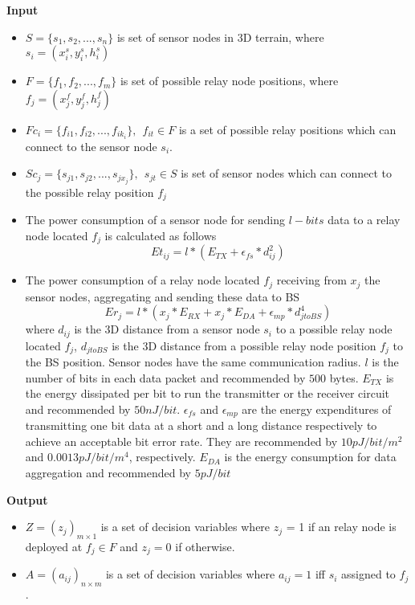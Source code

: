 \documentclass[paper.tex]{subfiles}
\begin{document}
	\textbf{Input}
	\begin{itemize}
		\item  $S = \{s_1, s_2,...,s_n\}$ is set of sensor nodes in 3D terrain, where $s_i = (x^s_i, y^s_i, h^s_i)$
		\item  $F = \{f_1,f_2,...,f_m\}$ is set of possible relay node positions, where $f_j = (x^f_j, y^f_j,h^f_j)$
		\item  $Fc_i = \{f_{i1}, f_{i2},...,f_{ik_i}\},~~f_{it} \in F$ is a set of possible relay positions which can connect to the sensor node $s_i$.
		\item  $Sc_j = \{s_{j1},s_{j2},...,s_{jx_j}\},~~s_{jt} \in S$ is set of sensor nodes which can connect to the possible relay position $f_j$
		\item The power consumption of a sensor node for sending $l-bits$ data to a relay node located $f_j$ is calculated as follows 
			\begin{equation}\label{eq:etij}
			Et_{ij} = l*(E_{TX} + \epsilon_{fs} * d^2_{ij})
			\end{equation}
		\item The power consumption of a relay node located $f_j$ receiving from $x_j$ the sensor nodes, aggregating and sending these data to \ac{BS}
			\begin{equation}\label{erj}
				Er_{j} = l*(x_j * E_{RX} + x_j* E_{DA} + \epsilon_{mp}*d_{jtoBS}^4)
			\end{equation}
		where $d_{ij}$ is the 3D distance from a sensor node $s_i$ to a possible relay node located $f_j$, $d_{jtoBS}$ is the 3D distance from a possible relay node position $f_j$ to the \ac{BS} position. Sensor nodes have the same communication radius. $l$ is the number of bits in each data packet and recommended by $500$ bytes. $E_{TX}$ is the energy dissipated per bit to run the transmitter or the receiver circuit and recommended by $50 nJ/bit$. $\epsilon_{fs}$ and $\epsilon_{mp}$ are the energy expenditures of transmitting one bit data at a short and a long distance respectively to achieve an acceptable bit error rate. They are recommended by $10pJ/bit/m^2$ and $0.0013pJ/bit/m^4$, respectively. $E_{DA}$ is the energy consumption for data aggregation and recommended
		by $5pJ/bit$
	\end{itemize}

	\textbf{Output}
	\begin{itemize}
		\item  $Z = (z_j)_{m\times 1}$ is a set of decision variables where $z_j$ = 1 if an relay node is deployed at $f_j \in F$ and $z_j = 0$ if otherwise. 
		\item $A = (a_{ij})_{n\times m}$ is a set of decision variables where $a_{ij} = 1$ iff $s_i$ assigned to $f_j$.
	\end{itemize}
\end{document}

